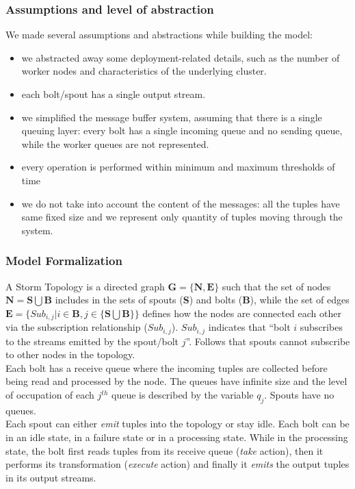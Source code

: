 \subsubsection{Assumptions and  level of abstraction}
We made several assumptions and abstractions while building the model:
\begin{itemize}
	\item we abstracted away some deployment-related details, such as the number of worker nodes and characteristics of the underlying cluster.
	\item each bolt/spout has a single output stream.
	\item we simplified the message buffer system, assuming that there is a single queuing layer: every bolt has a single incoming queue and no sending queue, while the worker queues are not represented.
	\item every operation is performed within minimum and maximum thresholds of time
	\item we do not take into account the content of the messages: all the tuples have same fixed size and we represent only quantity of tuples moving through the system.
\end{itemize}
\subsubsection{Model Formalization}
A Storm Topology is a directed graph $\mathbf{G} = \{ \mathbf{N}, \mathbf{E}\}$ such that the set of nodes $\mathbf{N} = \mathbf{S}\bigcup \mathbf{B}$ includes in the sets of spouts (\textbf{S}) and bolts (\textbf{B}), while the set of edges $\mathbf{E} = \{ Sub_{i,j} | i \in \mathbf{B}, j \in \{\mathbf{S}\bigcup \mathbf{B}\} \}$ defines how the nodes are connected each other via the subscription relationship ($Sub_{i,j}$). $Sub_{i,j}$ indicates that ``bolt $i$ subscribes to the streams emitted by the spout/bolt $j$''. Follows that spouts cannot subscribe to other nodes in the topology.\\
Each bolt has a receive queue where the incoming tuples are collected before being read and processed by the node.
The queues have infinite size and the level of occupation of each $j^{th}$ queue is described by the variable $q_j$. Spouts have no queues.\\
Each spout can either \textit{emit} tuples into the topology or stay idle.
Each bolt can be in an idle state, in a failure state or in a processing state.  While in the processing state, the bolt first reads tuples from its receive queue (\textit{take} action), then it performs its transformation (\textit{execute} action) and finally it \textit{emits} the output tuples in its output streams. \\

